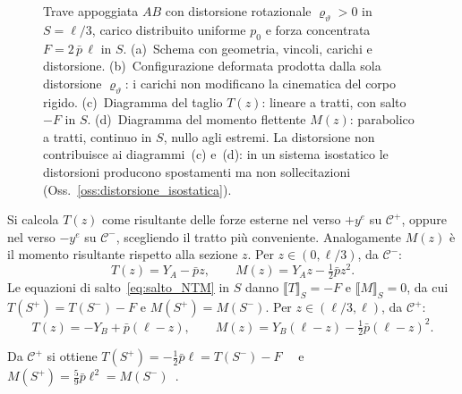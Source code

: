 \begin{esempio}
\begin{svolgimento}
\begin{figure}[!htbp]
{
			}
			\caption{Trave appoggiata $AB$ con distorsione
				rotazionale $\varrho_\vartheta > 0$ in
				$S = \ell/3$, carico distribuito uniforme $p_0$
				e forza concentrata $F = 2\,\bar{p}\,\ell$ in $S$.
				(a)~Schema con geometria, vincoli,
				carichi e distorsione.
				(b)~Configurazione deformata prodotta
				dalla sola distorsione $\varrho_\vartheta$:
				i carichi non modificano la cinematica del
				corpo rigido.
				(c)~Diagramma del taglio $T(z)$:
				lineare a tratti, con salto $-F$ in $S$.
				(d)~Diagramma del momento flettente
				$M(z)$: parabolico a tratti, continuo in $S$,
				nullo agli estremi. La distorsione non
				contribuisce ai diagrammi~(c) e~(d):
				in un sistema isostatico le distorsioni
				producono spostamenti ma non sollecitazioni
				(Oss.~\ref{oss:distorsione_isostatica}).}
			\label{fig:esempio_completo}
		\end{figure}
		Si calcola $T(z)$ come risultante delle forze esterne nel
		verso $+y^e$ su $\mathcal C^+$, oppure nel verso $-y^e$
		su $\mathcal C^-$, scegliendo il tratto più conveniente.
		Analogamente $M(z)$ è il momento risultante rispetto alla
		sezione $z$. Per $z \in (0,\ell/3)$, da $\mathcal C^-$:
		\begin{equation*}
			T(z) = Y_A - \bar p z, \qquad
			M(z) = Y_A z - \tfrac{1}{2}\bar p z^2.
		\end{equation*}
		Le equazioni di salto~\eqref{eq:salto_NTM} in $S$ danno
		$\llbracket T \rrbracket_S = -F$ e
		$\llbracket M \rrbracket_S = 0$, da cui
		$T(S^+) = T(S^-) - F$ e $M(S^+) = M(S^-)$.
		Per $z \in (\ell/3,\ell)$, da $\mathcal C^+$:
		\begin{equation*}
			T(z) = -Y_B + \bar p(\ell - z), \qquad
			M(z) = Y_B(\ell - z) - \tfrac{1}{2}\bar p(\ell - z)^2.
		\end{equation*}
		
		Da $\mathcal C^+$ si ottiene
		$T(S^+) = -\tfrac{1}{2}\bar p\ell = T(S^-) - F$~\checkmark
		\ e $M(S^+) = \tfrac{5}{9}\bar p\ell^2 = M(S^-)$~\checkmark.
		

\end{svolgimento}
\end{esempio}
